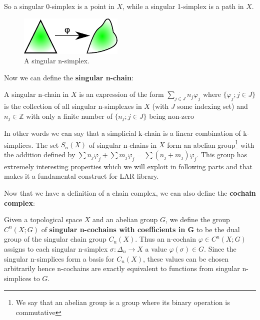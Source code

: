 So a singular 0-simplex is a point in $X$, while a singular 1-simplex is a path in $X$.

\begin{figure}[htb] %
   \centering
   \includegraphics[width=0.35\linewidth]{images/singularsimplex.pdf}
   \caption[A singular n-simplex]{A singular n-simplex.}
   \label{fig:singularSimplex}
\end{figure}


Now we can define the \textbf{singular n-chain}:

\begin{definition}
 A singular n-chain in $X$ is an expression of the form $\displaystyle\sum_{j  \in J} n_{j} \varphi_{j}$ where $\{ \varphi_{j}; j \in J \}$ is the collection of all singular n-simplexes in $X$ (with $J$ some indexing set) and $n_{j} \in \mathbb{Z}$ with only a finite number of $\{ n_{j}; j \in J \}$ being non-zero
\end{definition}

In other words we can say that a simplicial k-chain is a linear combination of k-simplices.
The set $S_{n}(X)$ of singular n-chains in $X$ form an abelian group\footnote{We say that an abelian group is a group where its binary operation is commutative} with the addition defined by $\sum n_{j} \varphi_{j} + \sum m_{j} \varphi_{j} = \sum(n_{j} + m_{j}) \varphi_{j}$. This group has extremely interesting properties which we will exploit in following parts and that makes it a fundamental construct for LAR library.

Now that we have a definition of a chain complex, we can also define the \textbf{cochain complex}:

\begin{definition}
Given a topological space $X$ and an abelian group $G$, we define the group $C^{n}(X;G)$ of \textbf{singular n-cochains with coefficients in G} to be the dual group of the singular chain group $C_{n}(X)$. Thus an n-cochain $\varphi \in C^{n}(X;G)$ assigns to each singular n-simplex $\sigma \colon \Delta_{n} \rightarrow X$ a value $\varphi(\sigma) \in G$. Since the singular n-simplices form a basis for $C_{n}(X)$, these values can be chosen arbitrarily hence n-cochains are exactly equivalent to functions from singular n-simplices to $G$.
\end{definition}

